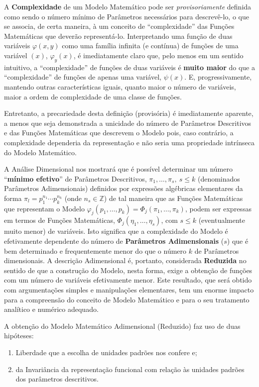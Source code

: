     A \textbf{Complexidade} de um Modelo Matemático pode ser \textit{provisoriamente} definida como sendo o número mínimo de Parâmetros necessários para descrevê-lo, o que se associa, de certa maneira, à um conceito de ``complexidade'' das Funções Matemáticas que deverão representá-lo. Interpretando uma função de duas variáveis \(\varphi(x, y)\) como uma família infinita (e contínua) de funções de uma variável \((x)\), \(\varphi_y(x)\), é imediatamente claro que, pelo menos em um sentido intuitivo, a ``complexidade'' de funções de duas variáveis é \textbf{muito maior} do que a ``complexidade'' de funções de apenas uma variável, \(\psi(x)\). E, progressivamente, mantendo outras características iguais, quanto maior o número de variáveis, maior a ordem de complexidade de uma classe de funções.

    Entretanto, a precariedade desta definição (provisória) é imediatamente aparente, a menos que seja demonstrada a unicidade do número de Parâmetros Descritivos e das Funções Matemáticas que descrevem o Modelo pois, caso contrário, a complexidade dependeria da representação e não seria uma propriedade intrínseca do Modelo Matemático.

    A Análise Dimensional nos mostrará que é possível determinar um número ``\textbf{míni\-mo efetivo}'' de Parâmetros Descritivos, \(\pi_1, \ldots, \pi_s,\ s \le k\) (denominados Parâmetros Adimensionais) definidos por expressões algébricas elementares da forma \(\pi_l = p_{1}^{n_1} \cdots p_{k}^{n_k}\) (onde \(n_s \in \mathbb{Z}\)) de tal maneira que as Funções Matemáticas que representam o Modelo \(\varphi_j(p_1, \ldots, p_k) = \Phi_j(\pi_1, \ldots, \pi_k)\), podem ser expressas em termos de Funções Matemáticas, \(\Phi_j(\eta_1, \ldots, \eta_s)\), com \(s \le k\) (eventualmente muito menor) de variáveis. Isto significa que a complexidade do Modelo é efetivamente dependente do número de \textbf{Parâmetros Adimensionais} (\(s\)) que é bem determinado e frequentemente menor do que o número \(k\) de Parâmetros dimensionais. A descrição Adimensional é, portanto, considerada \textbf{Reduzida} no sentido de que a construção do Modelo, nesta forma, exige a obtenção de funções com um número de variáveis efetivamente menor. Este resultado, que será obtido com argumentações simples e manipulações elementares, tem um enorme impacto para a compreensão do conceito de Modelo Matemático e para o seu tratamento analítico e numérico adequado.

    A obtenção do Modelo Matemático Adimensional (Reduzido) faz uso de duas hipóteses:
    \begin{enumerate}
    \item Liberdade que a escolha de unidades padrões nos confere e;
    \item da Invariância da representação funcional com relação às unidades padrões dos parâmetros descritivos.
    \end{enumerate}


